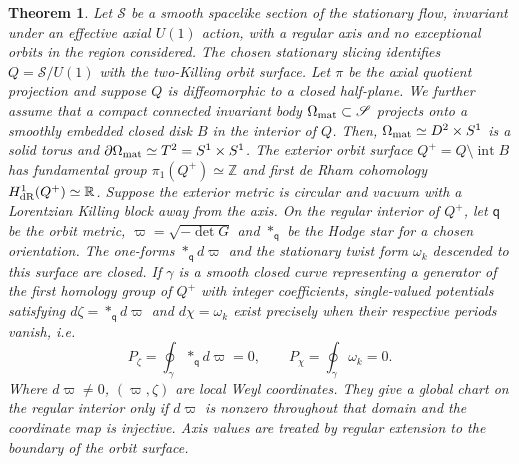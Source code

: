 \documentclass[amsmath,amsfonts,amssymb,aps,pra,superscriptaddress,10pt]{revtex4-2}
\numberwithin{equation}{section}
\theoremstyle{plain}
\newtheorem{theorem}{Theorem}
\theoremstyle{definition}
\theoremstyle{remark}
\theoremstyle{definition}
\begin{document}
\begin{theorem}\label{toroidbp}
Let $\mathscr{S}$ be a smooth spacelike section of the stationary flow, invariant under an effective axial $U(1)$ action, with a regular axis and no exceptional orbits in the region considered. The chosen stationary slicing identifies $Q=\mathscr{S}/U(1)$ with the two-Killing orbit surface. Let $\pi$ be the axial quotient projection and suppose $Q$ is diffeomorphic to a closed half-plane. We further assume that a compact connected invariant body $\Omega_{\rm{mat}}\subset\mathscr{S}$ projects onto a smoothly embedded closed disk $B$ in the interior of $Q$. Then,  $\Omega_{\rm{mat}}\simeq D^2\times S^1$ is a solid torus and $\partial\Omega_{\rm{mat}}\simeq T^2=S^1\times S^1$. The exterior orbit surface $Q^+=Q\setminus\operatorname{int}B$ has fundamental group $\pi_1(Q^+)\simeq\mathbb Z$ and first de Rham cohomology $H^1_{\rm{dR}}(Q^+)\simeq\mathbb{R}$. Suppose the exterior metric is circular and vacuum with a Lorentzian Killing block away from the axis. On the regular interior of $Q^+$, let $\mathsf{q}$ be the orbit metric, $\varpi=\sqrt{-\det G}$ and $*_{\mathsf{q}}$ be the Hodge star for a chosen orientation. The one-forms $*_{\mathsf{q}}d\varpi$ and the stationary twist form $\omega_k$ descended to this surface are closed. If $\gamma$ is a smooth closed curve representing a generator of the first homology group of $Q^+$ with integer coefficients, single-valued potentials satisfying $d\zeta=*_{\mathsf{q}}d\varpi$ and $d\chi=\omega_k$ exist precisely when their respective periods vanish, i.e.
\begin{equation}\label{toppertests}
P_\zeta=\oint_\gamma *_{\mathsf{q}}d\varpi=0,\qquad
P_\chi=\oint_\gamma\omega_k=0.
\end{equation}
Where $d\varpi\neq 0$, $(\varpi,\zeta)$ are local Weyl coordinates. They give a global chart on the regular interior only if $d\varpi$ is nonzero throughout that domain and the coordinate map is injective. Axis values are treated by regular extension to the boundary of the orbit surface.
\end{theorem}
\end{document}
